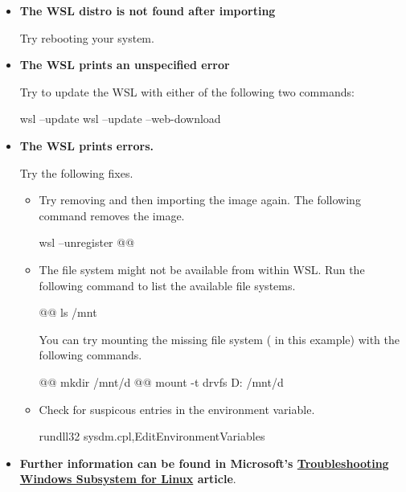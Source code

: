 \begin{itemize}
  \item {\bf The WSL distro is not found after importing}

    Try rebooting your system.
  \item {\bf The WSL prints an unspecified error}

    Try to update the WSL with either of the following two commands:
  \begin{monobox}
wsl --update
wsl --update --web-download
\end{monobox}
  \item {\bf The WSL prints  errors.}

    Try the following fixes.
    \begin{itemize}
      \item Try removing and then importing the image again.
        The following command removes the image.
        \begin{monobox}
wsl --unregister @\imagename{}@
\end{monobox}
      \item The file system might not be available from within WSL.
        Run the following command to list the available file systems.
        \begin{monobox}
@\cmdinwsl{}@ ls /mnt
\end{monobox}
        You can try mounting the missing file system ( in this example) with the following commands.
        \begin{monobox}
@\cmdinwsl{}@ mkdir /mnt/d
@\cmdinwsl{}@ mount -t drvfs D: /mnt/d
\end{monobox}
      \item Check for suspicous entries in the  environment variable.
        \begin{monobox}
rundll32 sysdm.cpl,EditEnvironmentVariables
\end{monobox}
    \end{itemize}
  \item {\bf Further information can be found in Microsoft's \href{https://learn.microsoft.com/en-us/windows/wsl/troubleshooting}{Troubleshooting Windows Subsystem for Linux} article}.
\end{itemize}
